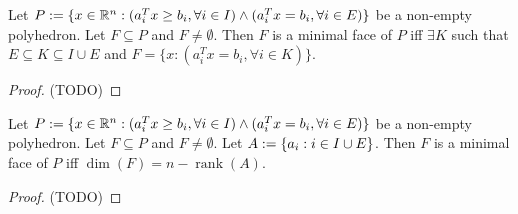 \documentclass[a4paper, 12pt, fleqn]{article}
\DeclareMathOperator{\rank}{rank}
\begin{document}
\begin{theorem}
Let $P := \{x \in \mathbb{R}^n: (a_i^Tx \ge b_i, \forall i \in I) \wedge (a_i^Tx = b_i, \forall i \in E)\}$
be a non-empty polyhedron. Let $F \subseteq P$ and $F \neq \emptyset$.
Then $F$ is a minimal face of $P$ iff $\exists K$ such that $E \subseteq K \subseteq I \cup E$
and $F = \{x: (a_i^Tx = b_i, \forall i \in K)\}$.
\end{theorem}
\begin{proof}
(TODO)
\end{proof}

\begin{theorem}
Let $P := \{x \in \mathbb{R}^n: (a_i^Tx \ge b_i, \forall i \in I) \wedge (a_i^Tx = b_i, \forall i \in E)\}$
be a non-empty polyhedron. Let $F \subseteq P$ and $F \neq \emptyset$.
Let $A := \{a_i: i \in I \cup E\}$.
Then $F$ is a minimal face of $P$ iff $\dim(F) = n - \rank(A)$.
\end{theorem}
\begin{proof}
(TODO)
\end{proof}
\end{document}

